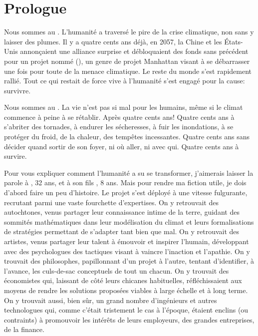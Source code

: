 

\chapter*{Prologue}


Nous sommes au \siecle. L'humanité a traversé le pire de la crise climatique,
non sans y laisser des plumes. Il y a quatre cents ans déjà, en 2057, la Chine
et les États-Unis annonçaient une alliance surprise et débloquaient des fonds
sans précédent pour un projet nommé  \textit{\nomProjet{}} (\nomProjetEn{}),
un genre de projet Manhattan visant à se débarrasser une fois pour toute de la
menace climatique.  Le reste du monde s'est rapidement rallié. Tout ce qui
restait de force vive à l'humanité s'est engagé pour la cause: survivre.

Nous sommes au \siecle. La vie n'est pas si mal pour les humains, même si le
climat commence à peine à se rétablir. Après quatre cents ans! Quatre cents ans à
s'abriter des tornades, à endurer les sécheresses, à fuir les inondations, à se
protéger du froid, de la chaleur, des tempêtes incessantes. Quatre cents ans
sans décider quand sortir de son foyer, ni où aller, ni avec qui.
Quatre cents ans à survire.

Pour vous expliquer comment l'humanité a su se transformer, j'aimerais
laisser la parole à \nomMere{}, 32 ans, et à son fils \nomEnfant{}, 8 ans.
Mais pour rendre ma fiction utile, je dois d'abord faire un peu
d'histoire.  Le projet \nomProjet{} s'est déployé à une vi\-tesse
fulgurante, recrutant parmi une vaste fourchette d'expertises.  On y
retrouvait des autochtones, venus partager leur connaissance intime de la
terre, guidant des sommités mathé\-matiques dans leur modélisation du climat et
leurs formalisations de stra\-tégies permettant de s'adapter tant
bien que mal.  On y retrouvait des artistes, venus partager leur talent à
émouvoir et inspirer l'humain, développant avec des psychologues des
tactiques visant à vaincre l'in\-act\-ion et l'apathie.  On y trouvait des
philosophes, papillonnant d'un projet à l'autre, tentant d'identifier, à
l'avance, les culs-de-sac con\-cept\-uels de tout un chacun.  On y trouvait
des économistes qui, laissant de côté leurs chicanes habituelles,
réfléchissaient aux moyens de rendre les solutions proposées viables à
large échelle et à long terme.  On y trouvait aussi, bien sûr, un grand
nombre d'ingénieurs et autres technologues qui, comme c'était trist\-ement
le cas à l'époque, étaient enclins (ou contraints) à promouvoir les
intérêts de leurs employeurs, des grandes entreprises, de la finance.

